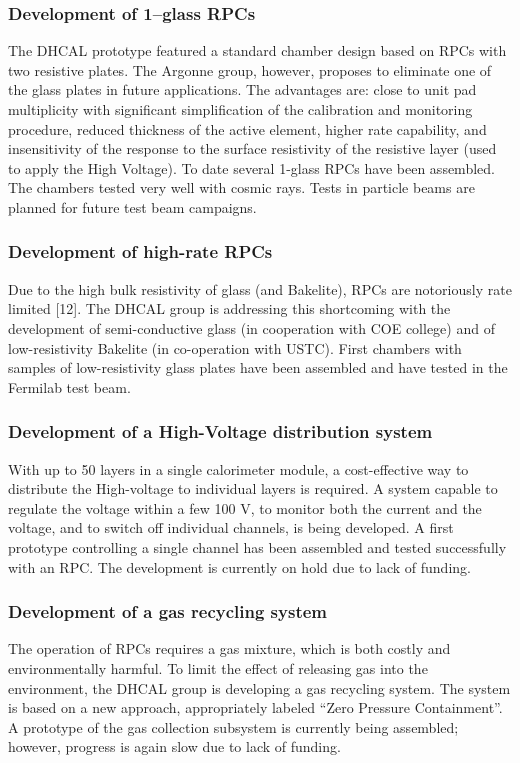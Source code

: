 \subsubsection{Development of 1--glass RPCs}
The DHCAL prototype featured a standard chamber design based on RPCs with two resistive plates. The Argonne group, however, proposes to eliminate one of the glass plates in future applications. The advantages are: close to unit pad multiplicity with significant simplification of the calibration and monitoring procedure, reduced thickness of the active element, higher rate capability, and insensitivity of the response to the surface resistivity of the resistive layer (used to apply the High Voltage). To date several 1-glass RPCs have been assembled. The chambers tested very well with cosmic rays. Tests in particle beams are planned for future test beam campaigns.  
\subsubsection{Development of high-rate RPCs}
Due to the high bulk resistivity of glass (and Bakelite), RPCs are notoriously rate limited [12]. The DHCAL group is addressing this shortcoming with the development of semi-conductive glass (in cooperation with COE college) and of low-resistivity Bakelite (in co-operation with USTC). First chambers with samples of low-resistivity glass plates have been assembled and have tested in the Fermilab test beam.
\subsubsection{Development of a High-Voltage distribution system}
With up to 50 layers in a single calorimeter module, a cost-effective way to distribute the High-voltage to individual layers is required. A system capable to regulate the voltage within a few 100 V, to monitor both the current and the voltage, and to switch off individual channels, is being developed. A first prototype controlling a single channel has been assembled and tested successfully with an RPC. The development is currently on hold due to lack of funding.
\subsubsection{Development of a gas recycling system}
The operation of RPCs requires a gas mixture, which is both costly and environmentally harmful. To limit the effect of releasing gas into the environment, the DHCAL group is developing a gas recycling system. The system is based on a new approach, appropriately labeled ``Zero Pressure Containment''. A prototype of the gas collection subsystem is currently being assembled; however, progress is again slow due to lack of funding.
